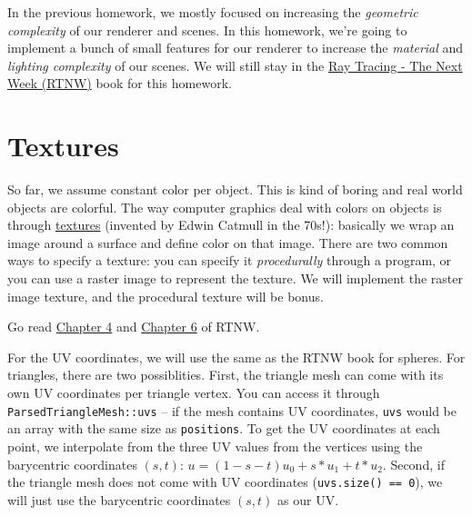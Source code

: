 
\usepackage{xcolor}




In the previous homework, we mostly focused on increasing the \emph{geometric complexity} of our renderer and scenes. In this homework, we're going to implement a bunch of small features for our renderer to increase the \emph{material} and \emph{lighting complexity} of our scenes. We will still stay in the \href{https://raytracing.github.io/books/RayTracingTheNextWeek.html}{Ray Tracing - The Next Week (RTNW)} book for this homework.

\section{Textures}
So far, we assume constant color per object. This is kind of boring and real world objects are {\color{red}c}{\color{orange}o}{\color{green}l}{\color{blue}o}{\color{cyan}r}f{\color{magenta}u}{\color{violet}l}. The way computer graphics deal with colors on objects is through \href{https://en.wikipedia.org/wiki/Texture_mapping}{textures} (invented by Edwin Catmull in the 70s!): basically we wrap an image around a surface and define color on that image. There are two common ways to specify a texture: you can specify it \emph{procedurally} through a program, or you can use a raster image to represent the texture. We will implement the raster image texture, and the procedural texture will be bonus.

Go read \href{https://raytracing.github.io/books/RayTracingTheNextWeek.html#solidtextures}{Chapter 4} and \href{https://raytracing.github.io/books/RayTracingTheNextWeek.html#imagetexturemapping}{Chapter 6} of RTNW.

For the UV coordinates, we will use the same as the RTNW book for spheres. For triangles, there are two possiblities. First, the triangle mesh can come with its own UV coordinates per triangle vertex. You can access it through \lstinline{ParsedTriangleMesh::uvs} -- if the mesh contains UV coordinates, \lstinline{uvs} would be an array with the same size as \lstinline{positions}. To get the UV coordinates at each point, we interpolate from the three UV values from the vertices using the barycentric coordinates $(s, t)$: $u = (1 - s - t)u_0 + s * u_1 + t * u_2$.
Second, if the triangle mesh does not come with UV coordinates (\lstinline{uvs.size() == 0}), we will just use the barycentric coordinates $(s, t)$ as our UV.

